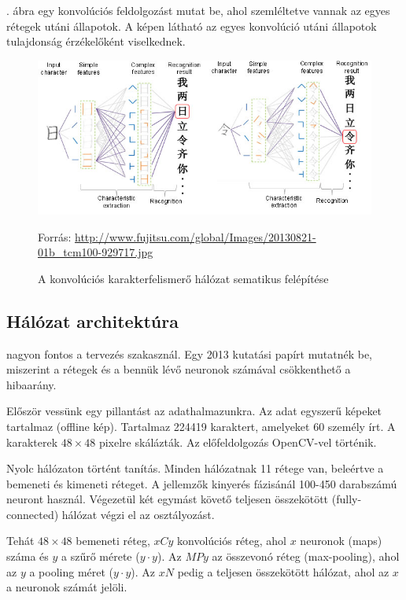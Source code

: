 . ábra egy konvolúciós feldolgozást mutat be, ahol szemléltetve vannak az egyes rétegek utáni állapotok. A képen látható az egyes konvolúció utáni állapotok tulajdonság érzékelőként viselkednek.

\begin{figure}[h]
\centering
\includegraphics[scale=0.65]{images/CNN_CCR_working}
\caption{A konvolúciós karakterfelismerő hálózat sematikus felépítése}
Forrás: \url{http://www.fujitsu.com/global/Images/20130821-01b_tcm100-929717.jpg}
\label{fig:CNN_CCR_working}
\end{figure}

\subsection{Hálózat architektúra}

nagyon fontos a tervezés szakasznál. Egy 2013 kutatási papírt\cite{cirecsan2015multi} mutatnék be, miszerint a rétegek és a bennük lévő neuronok számával csökkenthető a hibaarány.

Először vessünk egy pillantást az adathalmazunkra. Az adat egyszerű képeket tartalmaz (offline kép). Tartalmaz 224419 karaktert, amelyeket 60 személy írt. A karakterek $48 \times 48$ pixelre skálázták. Az előfeldolgozás OpenCV-vel történik.

Nyolc hálózaton történt tanítás. Minden hálózatnak 11 rétege van, beleértve a bemeneti és kimeneti réteget. A jellemzők kinyerés fázisánál 100-450 darabszámú neuront használ. Végezetül két egymást követő teljesen összekötött (fully-connected) hálózat végzi el az osztályozást.

Tehát $48 \times 48$ bemeneti réteg, $xCy$ konvolúciós réteg, ahol $x$ neuronok (maps) száma és $y$ a szűrő mérete ($y \cdot y$). Az $MPy$ az összevonó réteg (max-pooling), ahol az $y$ a pooling méret ($y \cdot y$). Az $xN$ pedig a teljesen összekötött hálózat, ahol az $x$ a neuronok számát jelöli.

